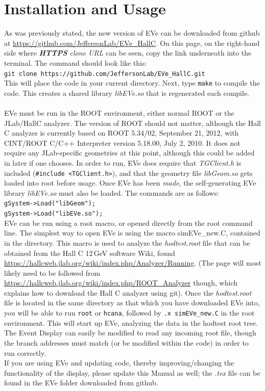 \documentclass[12pt]{article}
\numberwithin{equation}{section}
\begin{document}
\section{Installation and Usage}
As was previously stated, the new version of EVe can be downloaded from github at \url{https://github.com/JeffersonLab/EVe\_HallC}. On this page, on the right-hand side where \textit{\textbf{HTTPS} clone URL} can be seen, copy the link underneath into the terminal. The command should look like this:
\\
\hspace*{1cm}\texttt{git clone https://github.com/JeffersonLab/EVe\_HallC.git}
\\
This will place the code in your current directory. Next, type \texttt{make} to compile the code. This creates a shared library \textit{libEVe.so} that is regenerated each compile. 
\\
\\
EVe must be run in the ROOT environment, either normal ROOT or the JLab/HallC analyzer. The version of ROOT should not matter, although the Hall C analyzer is currently based on ROOT 5.34/02, September 21, 2012, with CINT/ROOT C/C++ Interpreter version 5.18.00, July 2, 2010. It does not require any JLab-specific geometries at this point, although this could be added in later if one chooses. In order to run, EVe does require that \textit{TGClient.h} is included (\texttt{\#include <TGClient.h>}), and that the geometry file \textit{libGeom.so} gets loaded into root before usage. Once EVe has been \textit{made}, the self-generating EVe library \textit{libEVe.so} must also be loaded. The commands are as follows:
\\
\hspace*{1cm}\texttt{gSystem->Load("libGeom");} \\
\hspace*{1cm}\texttt{gSystem->Load("libEVe.so");}
\\
EVe can be run using a root macro, or opened directly from the root command line. The simplest way to open EVe is using the macro simEVe\_new.C, contained in the directory. This macro is used to analyze the \textit{hodtest.root} file that can be obtained from the Hall C 12\,GeV software Wiki, found \url{https://hallcweb.jlab.org/wiki/index.php/Analyzer/Running}. (The page will most likely need to be followed from \url{https://hallcweb.jlab.org/wiki/index.php/ROOT_Analyzer} though, which explains how to download the Hall C analyzer using git). Once the \textit{hodtest.root} file is located in the same directory as that which you have downloaded EVe into, you will be able to run \texttt{root} or \texttt{hcana}, followed by \texttt{.x simEVe\_new.C} in the root environment. This will start up EVe, analyzing the data in the hodtest root tree. The Event Display can easily be modified to read any incoming root file, though the branch addresses must match (or be modified within the code) in order to run correctly.
\\
If you are using EVe and updating code, thereby improving/changing the functionality of the display, please update this Manual as well; the \textit{.tex} file can be found in the EVe folder downloaded from github.
\end{document}
